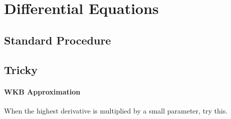 \section{Differential Equations}

\subsection{Standard Procedure}


\subsection{Tricky}

\paragraph{WKB Approximation}

When the highest derivative is multiplied by a small parameter, try this.